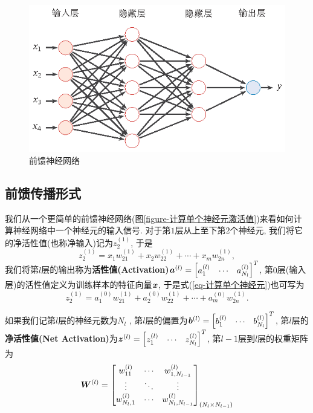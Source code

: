 \documentclass[12pt, a4paper, oneside]{ctexart}
\begin{document}
\begin{figure}[htbp]
    \centering
    \includegraphics[scale=1.5]{前馈神经网络.eps}
    \caption{前馈神经网络\protect\footnotemark[1]}
    \label{figure-前馈神经网络}
\end{figure}

\subsection{前馈传播形式}

我们从一个更简单的前馈神经网络(图\ref{figure-计算单个神经元激活值})来看如何计算神经网络中一个神经元的输入信号. 对于第$1$层从上至下第$2$个神经元, 我们将它的净活性值(也称净输入)记为$z_2^{(1)}$, 于是
\begin{equation}\label{eq-计算单个神经元}
    z_2^{(1)} = x_1w_{21}^{(1)} + x_2w_{22}^{(1)} + \cdots + x_mw_{2n}^{(1)},
\end{equation}
我们将第$l$层的输出称为\textbf{活性值(Activation)}$\boldsymbol{a}^{(l)}=\left[\begin{matrix}
    a_1^{(l)}&\cdots&a_{N_l}^{(l)}
\end{matrix}\right]^T$, 第$0$层(输入层)的活性值定义为训练样本的特征向量$\boldsymbol{x}$, 于是式(\ref{eq-计算单个神经元})也可写为
\begin{equation}\label{eq-计算单个神经元1}
    z_2^{(1)} = a_1^{(0)}w_{21}^{(1)} + a_2^{(0)}w_{22}^{(1)} + \cdots + a_m^{(0)}w_{2n}^{(1)}.
\end{equation}

如果我们记第$l$层的神经元数为$N_l$ , 第$l$层的偏置为$\boldsymbol{b}^{(l)}=\left[\begin{matrix}
    b_1^{(l)}&\cdots&b_{N_{l}}^{(l)}
\end{matrix}\right]^T$, 第$l$层的\textbf{净活性值(Net Activation)}为$\boldsymbol{z}^{(l)}=\left[\begin{matrix}
    z_1^{(l)}&\cdots&z_{N_l}^{(l)}
\end{matrix}\right]^T$, 第$l-1$层到$l$层的权重矩阵为
\begin{equation*}
    \boldsymbol{W}^{(l)}=\left[\begin{matrix}
        w_{11}^{(l)}&\cdots&w_{1,N_{l-1}}^{(l)}\\
        \vdots&\ddots&\vdots\\
        w_{N_l,1}^{(l)}&\cdots&w_{N_l,N_{l-1}}^{(l)}
    \end{matrix}\right]_{(N_l\times N_{l-1})}
\end{equation*}
\end{document}
